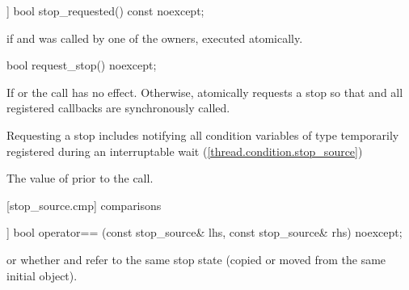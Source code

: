 {%
\begin{itemdecl}
[[nodiscard]] bool stop_requested() const noexcept;
\end{itemdecl}
\begin{itemdescr}
  \pnum\returns {} if  
                and  was called by one of the owners, executed atomically.
\end{itemdescr}

%
\begin{itemdecl}
bool request_stop() noexcept;
\end{itemdecl}
\begin{itemdescr}

  \pnum\effects If  or  the call has no effect. 
                Otherwise, atomically requests a stop so that 
                and all registered callbacks are synchronously called.
                \begin{note} Requesting a stop includes notifying all condition variables
                             of type 
                             temporarily registered during an interruptable wait (\ref{thread.condition.stop_source})
                             \end{note}

  \pnum\postconditions {}

  \pnum\returns The value of  prior to the call.
\end{itemdescr}


[stop_source.cmp]{ comparisons}

%
\begin{itemdecl}
[[nodiscard]] bool operator== (const stop_source& lhs, const stop_source& rhs) noexcept;
\end{itemdecl}
\begin{itemdescr}
  \pnum\returns {} or
                whether  and  refer to the
                same stop state
                (copied or moved from the same initial  object).
\end{itemdescr}

}

